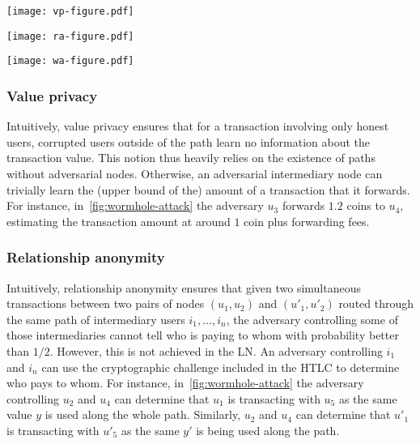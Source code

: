 \begin{figure*}[tb]
	\texttt{[image: vp-figure.pdf]}
	
	\vspace{0.3cm}
	
	\texttt{[image: ra-figure.pdf]}
	
	\vspace{0.3cm}
	
	\texttt{[image: wa-figure.pdf]}
	
	\caption{\label{fig:wormhole-attack} An illustrative example of value privacy (top), relationship anonymity (middle), and the wormhole attack (bottom).}
\end{figure*}

\subsubsection{Value privacy}
Intuitively, value privacy ensures that for a transaction involving only honest users, 
corrupted users outside of the path learn no information about the transaction value.
This notion thus heavily relies on the existence of paths without adversarial nodes.  
Otherwise, an adversarial intermediary node can trivially learn the (upper bound of the) amount of a transaction that it forwards. 
For instance, in~\cref{fig:wormhole-attack} the adversary $u_3$
forwards $1.2$ coins to $u_4$, estimating the transaction amount at around $1$ coin plus forwarding fees.

\subsubsection{Relationship anonymity}
Intuitively, relationship anonymity ensures that given two simultaneous transactions 
between two pairs of nodes $(u_1, u_2)$ and $(u'_1, u'_2)$ routed through the same path of intermediary 
users $i_1, \ldots, i_n$, the adversary controlling some of those intermediaries cannot tell who is paying to whom with probability better than $1/2$.
However, this is not achieved in the LN.
An adversary controlling $i_1$ and $i_n$ can use the cryptographic challenge included in the HTLC to 
determine who pays to whom.
For instance, in~\cref{fig:wormhole-attack} the adversary controlling $u_2$ 
and $u_4$ can determine that $u_1$ is transacting with $u_5$ as the same value $y$ is used along the whole path. 
Similarly, $u_2$ and $u_4$ can determine that $u'_1$ is transacting with $u'_5$ as the same $y'$ is being used along the path. 

